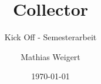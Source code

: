 \title [Collector] {Collector}										%
\subtitle [Semesterarbeit] {Kick Off - Semesterarbeit}				%

\author[M. Weigert] {Mathias Weigert}								%

\date{\today}														%


\subject{Kick Off Semesterarbeit}									%
